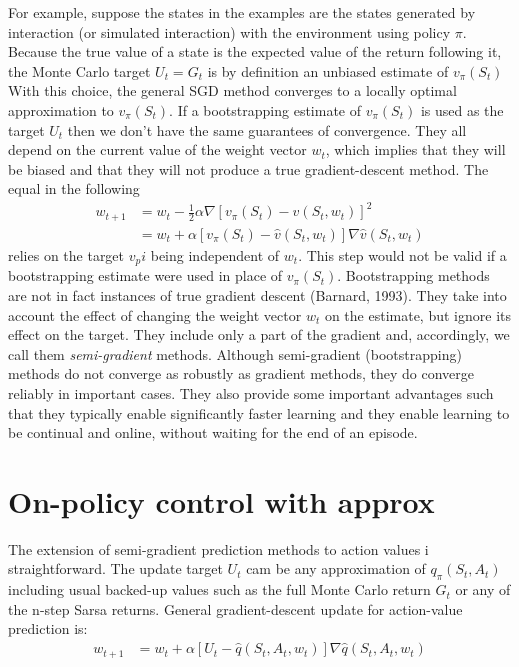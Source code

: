 For example, suppose the states in the examples are the states generated by interaction
(or simulated interaction) with the environment using policy $\pi$. Because the true value of
a state is the expected value of the return following it, the Monte Carlo target $U_t=G_t$
is by definition an unbiased estimate of $ v_\pi(S_t)$
With this choice, the general SGD method converges to a locally optimal approximation to
$ v_\pi(S_t)$. 
If a bootstrapping estimate of $ v_\pi(S_t)$ is used as the target $U_t$ then we don't
have the same guarantees of convergence.
They all depend on the current value of the weight vector $w_t$, which implies that they will
be biased and that they will not produce a true gradient-descent method.
The equal in the following
\begin{align}
    w_{t+1}&=w_t - \frac{1}{2}\alpha\nabla [v_\pi(S_t)-\hat v(S_t, w_t)]^2 \\
    &=w_t +\alpha  [v_\pi(S_t)- \hat v(S_t, w_t)]\nabla \hat v(S_t, w_t)
\end{align}
relies on the target $v_pi$ being independent of $w_t$. This step would not be valid if a bootstrapping
estimate were used in place of $v_\pi(S_t)$.
Bootstrapping methods are not in fact instances of true gradient descent (Barnard, 1993).
They take into account the effect of changing the weight vector $w_t$ on the estimate, but
ignore its effect on the target.
They include only a part of the gradient and, accordingly, we call them \textit{semi-gradient}
methods.
Although semi-gradient (bootstrapping) methods do not converge as robustly as
gradient methods, they do converge reliably in important cases. They also provide some
important advantages such that they typically enable significantly faster learning
and they enable learning to be continual and online, without waiting for the end of an episode.

\section{On-policy control with approx}
The extension of semi-gradient prediction methods to action values i straightforward.
The update target $U_t$ cam be any approximation of $q_\pi(S_t, A_t)$ including usual backed-up values such as 
the full Monte Carlo return $G_t$ or any of the n-step Sarsa returns.
General gradient-descent update for action-value prediction is:
\begin{align}
    w_{t+1}&=w_t +\alpha  [U_t- \hat q(S_t,A_t, w_t)]\nabla \hat q(S_t,A_t, w_t)
\end{align}

